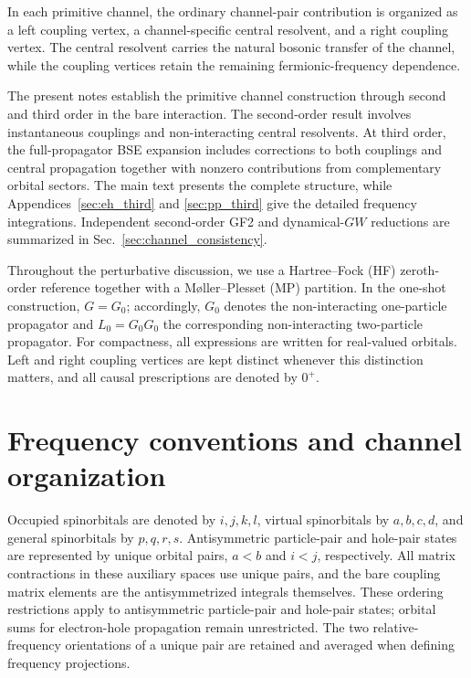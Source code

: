 \documentclass[aip,jcp,reprint,noshowkeys,superscriptaddress]{revtex4-1}
\begin{document}
In each primitive channel, the ordinary channel-pair contribution is
organized as a left coupling vertex, a channel-specific central resolvent,
and a right coupling vertex.
The central resolvent carries the natural bosonic transfer of the channel,
while the coupling vertices retain the remaining fermionic-frequency dependence.


The present notes establish the primitive channel construction through
second and third order in the bare interaction.
The second-order result involves instantaneous couplings and non-interacting
central resolvents. At third order, the full-propagator BSE expansion
includes corrections to both couplings and central propagation together
with nonzero contributions from complementary orbital sectors.
The main text presents the complete structure, while Appendices~\ref{sec:eh_third}
and \ref{sec:pp_third} give the detailed frequency integrations.
Independent second-order GF2 and dynamical-$GW$ reductions are summarized
in Sec.~\ref{sec:channel_consistency}.

Throughout the perturbative discussion, we use a Hartree--Fock (HF) zeroth-order
reference together with a M{\o}ller--Plesset (MP) partition.
In the one-shot construction, $G=G_0$; accordingly, $G_0$ denotes the non-interacting one-particle propagator and
$L_0=G_0G_0$ the corresponding non-interacting two-particle propagator.
For compactness, all expressions are written for real-valued orbitals.
Left and right coupling vertices are kept distinct whenever this distinction
matters, and all causal prescriptions are denoted by $0^+$.

\section{Frequency conventions and channel organization}
\label{sec:frequencies}


Occupied spinorbitals are denoted by $i,j,k,l$, virtual spinorbitals by
$a,b,c,d$, and general spinorbitals by $p,q,r,s$.
Antisymmetric particle-pair and hole-pair states are represented by unique
orbital pairs, $a<b$ and $i<j$, respectively.
All matrix contractions in these auxiliary spaces use unique pairs,
and the bare coupling matrix elements are the antisymmetrized integrals themselves.
These ordering restrictions apply to antisymmetric particle-pair and hole-pair
states; orbital sums for electron-hole propagation remain unrestricted.
The two relative-frequency orientations of a unique pair are retained and
averaged when defining frequency projections.
\end{document}
